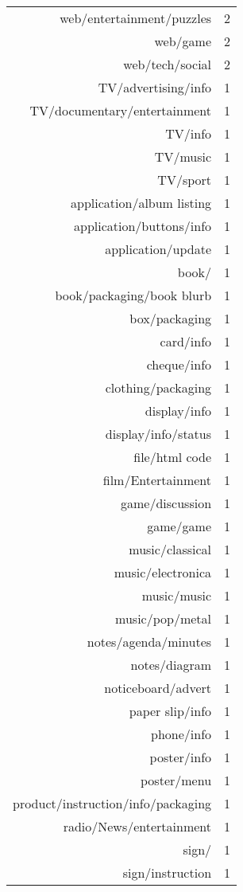 \begin{table}[ht]
\begin{tabular}{rr}
  web/entertainment/puzzles &   2 \\ 
  web/game &   2 \\ 
  web/tech/social &   2 \\ 
  TV/advertising/info &   1 \\ 
  TV/documentary/entertainment &   1 \\ 
  TV/info &   1 \\ 
  TV/music &   1 \\ 
  TV/sport &   1 \\ 
  application/album listing &   1 \\ 
  application/buttons/info &   1 \\ 
  application/update &   1 \\ 
  book/ &   1 \\ 
  book/packaging/book blurb &   1 \\ 
  box/packaging &   1 \\ 
  card/info &   1 \\ 
  cheque/info &   1 \\ 
  clothing/packaging &   1 \\ 
  display/info &   1 \\ 
  display/info/status &   1 \\ 
  file/html code &   1 \\ 
  film/Entertainment &   1 \\ 
  game/discussion &   1 \\ 
  game/game &   1 \\ 
  music/classical &   1 \\ 
  music/electronica &   1 \\ 
  music/music &   1 \\ 
  music/pop/metal &   1 \\ 
  notes/agenda/minutes &   1 \\ 
  notes/diagram &   1 \\ 
  noticeboard/advert &   1 \\ 
  paper slip/info &   1 \\ 
  phone/info &   1 \\ 
  poster/info &   1 \\ 
  poster/menu &   1 \\ 
  product/instruction/info/packaging &   1 \\ 
  radio/News/entertainment &   1 \\ 
  sign/ &   1 \\ 
  sign/instruction &   1 \\ 

\end{tabular}
\end{table}

